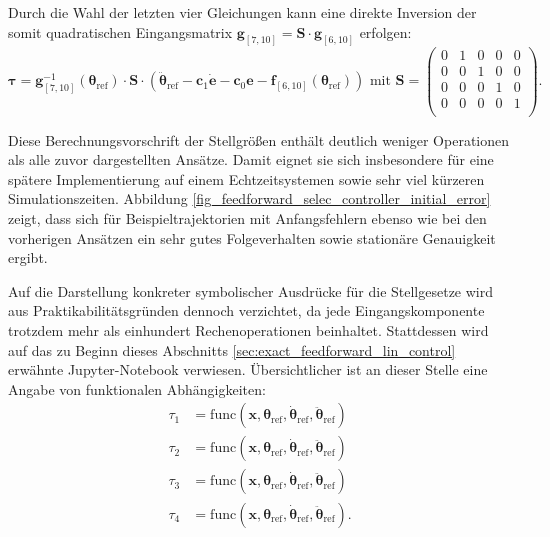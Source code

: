 Durch die Wahl der letzten vier Gleichungen kann eine direkte Inversion der somit quadratischen Eingangsmatrix $\mathbf{g}_{[7, 10]} = \mathbf{S} \cdot \mathbf{g}_{[6, 10]}$ erfolgen:
\begin{equation}
	\boldsymbol{\tau}= \mathbf{g}^{-1}_{[7, 10]}(\boldsymbol{\theta}_{\text{ref}}) \cdot \mathbf{S} \cdot (\ddot{\boldsymbol{\theta}}_{\text{ref}} - \mathbf{c}_{1} \mathbf{\dot{e}} - \mathbf{c}_{0} \mathbf{e} - \mathbf{f}_{[6, 10]}(\boldsymbol{\theta}_{\text{ref}})) \text{ mit } 
	\mathbf{S} = 
	\begin{pmatrix}
	0 & 1 & 0 & 0 & 0 \\
	0 & 0 & 1 & 0 & 0 \\
	0 & 0 & 0 & 1 & 0 \\
	0 & 0 & 0 & 0 & 1 \\
	\end{pmatrix}.
\end{equation}

Diese Berechnungsvorschrift der Stellgrößen enthält deutlich weniger Operationen als alle zuvor dargestellten Ansätze. Damit eignet sie sich insbesondere für eine spätere Implementierung auf einem Echtzeitsystemen sowie sehr viel kürzeren Simulationszeiten. Abbildung \ref{fig_feedforward_selec_controller_initial_error} zeigt, dass sich für Beispieltrajektorien mit Anfangsfehlern ebenso wie bei den vorherigen Ansätzen ein sehr gutes Folgeverhalten sowie stationäre Genauigkeit ergibt.

Auf die Darstellung konkreter symbolischer Ausdrücke für die Stellgesetze wird aus Praktikabilitätsgründen dennoch verzichtet, da jede Eingangskomponente trotzdem mehr als einhundert Rechenoperationen beinhaltet. Stattdessen wird auf das zu Beginn dieses Abschnitts \ref{sec:exact_feedforward_lin_control} erwähnte Jupyter-Notebook verwiesen. Übersichtlicher ist an dieser Stelle eine Angabe von funktionalen Abhängigkeiten:
\begin{subequations}
	\begin{align}
		\tau_1 &= \mathrm{func}(\mathbf{x}, \boldsymbol{\theta}_{\mathrm{ref}}, \dot{\boldsymbol{\theta}}_{\mathrm{ref}}, \ddot{\boldsymbol{\theta}}_{\mathrm{ref}}) \\
		\tau_2 &= \mathrm{func}(\mathbf{x}, \boldsymbol{\theta}_{\mathrm{ref}}, \dot{\boldsymbol{\theta}}_{\mathrm{ref}}, \ddot{\boldsymbol{\theta}}_{\mathrm{ref}}) \\
		\tau_3 &= \mathrm{func}(\mathbf{x}, \boldsymbol{\theta}_{\mathrm{ref}}, \dot{\boldsymbol{\theta}}_{\mathrm{ref}}, \ddot{\boldsymbol{\theta}}_{\mathrm{ref}}) \\
		\tau_4 &= \mathrm{func}(\mathbf{x}, \boldsymbol{\theta}_{\mathrm{ref}}, \dot{\boldsymbol{\theta}}_{\mathrm{ref}}, \ddot{\boldsymbol{\theta}}_{\mathrm{ref}}).
	\end{align}
\end{subequations}

